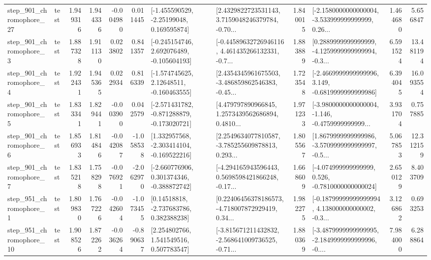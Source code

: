 \begin{tabular}{llrrrrllrlrr}
  step\_901\_chromophore\_27 &      test &      1.949316 &    1.944336 &     -0.004980 &  0.011445 &    [-1.455590529, -2.25199048, 0.169595874] &  [2.4329822723531143, 3.7159048246379784, -0.70... &       1.840015 &  [-2.1580000000000004, -3.533999999999999, 0.26... &            1.464680 &          5.656847 \\
   step\_901\_chromophore\_3 &      test &      1.887328 &    1.911130 &      0.023802 &  0.841357 &   [-0.245154746, 2.692076489, -0.105604193] &  [-0.44589632726946116, 4.461435266132331, -0.7... &       1.883889 &  [0.2889999999999999, -4.1259999999999994, -0.3... &            6.591524 &         13.481194 \\
   step\_901\_chromophore\_4 &      test &      1.922431 &    1.945365 &      0.022934 &  0.816339 &    [-1.574745625, 2.12648511, -0.160463555] &  [2.4354345961675503, -3.486859862546383, -0.45... &       1.723548 &  [-2.4669999999999996, 3.149, -0.6819999999999986] &            6.394045 &         16.093554 \\
   step\_901\_chromophore\_5 &      test &      1.833341 &    1.829441 &     -0.003900 &  0.042579 &  [-2.571431782, -0.871288879, -0.173020721] &  [4.479797890966845, 1.2573439562686894, 0.4810... &       1.971233 &  [-3.9800000000000004, -1.146, -0.4759999999999... &            3.931704 &          0.757885 \\
   step\_901\_chromophore\_6 &      test &      1.856933 &    1.814846 &     -0.042087 & -1.058538 &   [1.332957568, -2.303414104, -0.169522216] &  [2.2549634077810587, -3.785255609878813, 0.293... &       1.805567 &  [1.8679999999999986, -3.5709999999999997, -0.5... &            5.067853 &         12.312159 \\
   step\_901\_chromophore\_7 &      test &      1.835218 &    1.758298 &     -0.076921 & -2.062970 &   [-2.660776906, 0.301374346, -0.388872742] &  [-4.294165943596443, 0.5698598421866248, -0.17... &       1.668609 &   [-4.074999999999999, 0.526, -0.7810000000000024] &            2.650129 &          8.403709 \\
   step\_951\_chromophore\_1 &      test &      1.809830 &    1.767226 &     -0.042604 & -1.073455 &     [0.14518818, -2.737683786, 0.382388238] &  [0.22406456378186573, -4.718007872929419, 0.34... &       1.982275 &  [-0.18799999999999994, 4.138000000000002, -0.3... &            3.126862 &          0.693253 \\
  step\_951\_chromophore\_10 &      test &      1.908526 &    1.872262 &     -0.036264 & -0.890637 &     [2.254802766, 1.541549516, 0.507783547] &  [-3.815671211432832, -2.568641009736525, -0.71... &       1.880369 &  [-3.4879999999999995, -2.1849999999999996, -0.... &            7.984000 &          6.288864 \\

\end{tabular}
